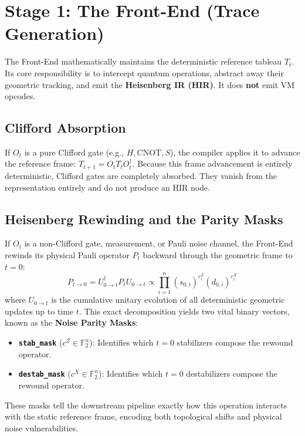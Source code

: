 \documentclass[11pt]{article}
\begin{document}
\section{Stage 1: The Front-End (Trace Generation)}

The Front-End mathematically maintains the deterministic reference tableau $T_t$. Its core responsibility is to intercept quantum operations, abstract away their geometric tracking, and emit the \textbf{Heisenberg IR (HIR)}. It does \textbf{not} emit VM opcodes.

\subsection{Clifford Absorption}
If $O_t$ is a pure Clifford gate (e.g., $H, \text{CNOT}, S$), the compiler applies it to advance the reference frame: $T_{t+1} = O_t T_t O_t^\dagger$. Because this frame advancement is entirely deterministic, Clifford gates are completely absorbed. They vanish from the representation entirely and do not produce an HIR node.

\subsection{Heisenberg Rewinding and the Parity Masks}
If $O_t$ is a non-Clifford gate, measurement, or Pauli noise channel, the Front-End rewinds its physical Pauli operator $P_t$ backward through the geometric frame to $t=0$:
\begin{equation}
    P_{t \to 0} = U_{0 \to t}^\dagger P_t U_{0 \to t} \propto \prod_{i=1}^n (s_{0,i})^{c^Z_i} (d_{0,i})^{c^X_i}
\end{equation}
where $U_{0 \to t}$ is the cumulative unitary evolution of all deterministic geometric updates up to time $t$. This exact decomposition yields two vital binary vectors, known as the \textbf{Noise Parity Masks}:
\begin{itemize}
    \item \textbf{\texttt{stab\_mask}} ($c^Z \in \mathbb{F}_2^n$): Identifies which $t=0$ stabilizers compose the rewound operator.
    \item \textbf{\texttt{destab\_mask}} ($c^X \in \mathbb{F}_2^n$): Identifies which $t=0$ destabilizers compose the rewound operator.
\end{itemize}
These masks tell the downstream pipeline exactly how this operation interacts with the static reference frame, encoding both topological shifts and physical noise vulnerabilities.
\end{document}
